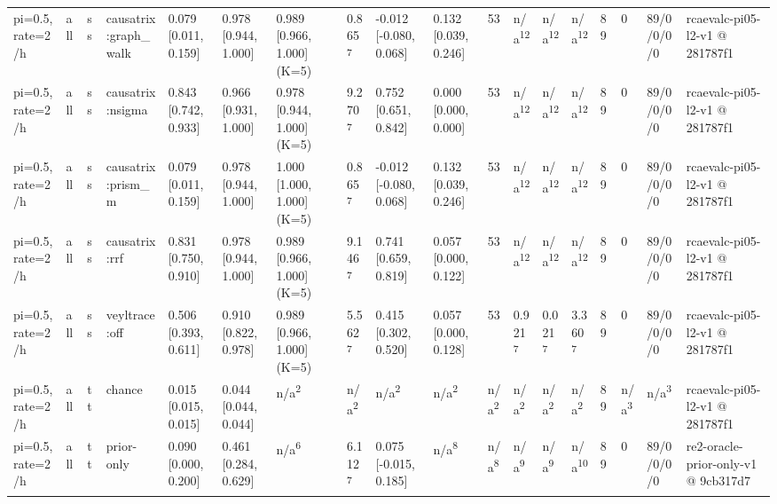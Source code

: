 \begin{table}[t]
\begin{tabular}{llllllllllllllllll}
pi=0.5, rate=2/h & all & ss & causatrix:graph\_walk & 0.079 [0.011, 0.159] & 0.978 [0.944, 1.000] & 0.989 [0.966, 1.000] (K=5) & 0.865\textsuperscript{7} & -0.012 [-0.080, 0.068] & 0.132 [0.039, 0.246] & 53 & n/a\textsuperscript{12} & n/a\textsuperscript{12} & n/a\textsuperscript{12} & 89 & 0 & 89/0/0/0/0 & rcaevalc-pi05-l2-v1 @ 281787f1 \\
pi=0.5, rate=2/h & all & ss & causatrix:nsigma & 0.843 [0.742, 0.933] & 0.966 [0.931, 1.000] & 0.978 [0.944, 1.000] (K=5) & 9.270\textsuperscript{7} & 0.752 [0.651, 0.842] & 0.000 [0.000, 0.000] & 53 & n/a\textsuperscript{12} & n/a\textsuperscript{12} & n/a\textsuperscript{12} & 89 & 0 & 89/0/0/0/0 & rcaevalc-pi05-l2-v1 @ 281787f1 \\
pi=0.5, rate=2/h & all & ss & causatrix:prism\_m & 0.079 [0.011, 0.159] & 0.978 [0.944, 1.000] & 1.000 [1.000, 1.000] (K=5) & 0.865\textsuperscript{7} & -0.012 [-0.080, 0.068] & 0.132 [0.039, 0.246] & 53 & n/a\textsuperscript{12} & n/a\textsuperscript{12} & n/a\textsuperscript{12} & 89 & 0 & 89/0/0/0/0 & rcaevalc-pi05-l2-v1 @ 281787f1 \\
pi=0.5, rate=2/h & all & ss & causatrix:rrf & 0.831 [0.750, 0.910] & 0.978 [0.944, 1.000] & 0.989 [0.966, 1.000] (K=5) & 9.146\textsuperscript{7} & 0.741 [0.659, 0.819] & 0.057 [0.000, 0.122] & 53 & n/a\textsuperscript{12} & n/a\textsuperscript{12} & n/a\textsuperscript{12} & 89 & 0 & 89/0/0/0/0 & rcaevalc-pi05-l2-v1 @ 281787f1 \\
pi=0.5, rate=2/h & all & ss & veyltrace:off & 0.506 [0.393, 0.611] & 0.910 [0.822, 0.978] & 0.989 [0.966, 1.000] (K=5) & 5.562\textsuperscript{7} & 0.415 [0.302, 0.520] & 0.057 [0.000, 0.128] & 53 & 0.921\textsuperscript{7} & 0.021\textsuperscript{7} & 3.360\textsuperscript{7} & 89 & 0 & 89/0/0/0/0 & rcaevalc-pi05-l2-v1 @ 281787f1 \\
pi=0.5, rate=2/h & all & tt & chance & 0.015 [0.015, 0.015] & 0.044 [0.044, 0.044] & n/a\textsuperscript{2} & n/a\textsuperscript{2} & n/a\textsuperscript{2} & n/a\textsuperscript{2} & n/a\textsuperscript{2} & n/a\textsuperscript{2} & n/a\textsuperscript{2} & n/a\textsuperscript{2} & 89 & n/a\textsuperscript{3} & n/a\textsuperscript{3} & rcaevalc-pi05-l2-v1 @ 281787f1 \\
pi=0.5, rate=2/h & all & tt & prior-only & 0.090 [0.000, 0.200] & 0.461 [0.284, 0.629] & n/a\textsuperscript{6} & 6.112\textsuperscript{7} & 0.075 [-0.015, 0.185] & n/a\textsuperscript{8} & n/a\textsuperscript{8} & n/a\textsuperscript{9} & n/a\textsuperscript{9} & n/a\textsuperscript{10} & 89 & 0 & 89/0/0/0/0 & re2-oracle-prior-only-v1 @ 9cb317d7 \\

\end{tabular}
\end{table}

